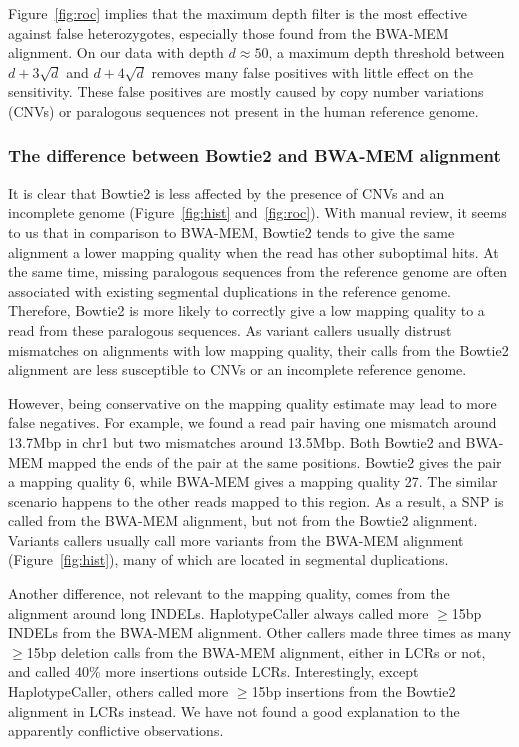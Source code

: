 \documentclass{bioinfo}
\begin{document}
Figure~\ref{fig:roc} implies that the maximum depth filter is the most
effective against false heterozygotes, especially those found from the BWA-MEM
alignment. On our data with depth $d\approx50$, a maximum depth threshold
between $d+3\sqrt{d}$ and $d+4\sqrt{d}$ removes many false positives with
little effect on the sensitivity. These false positives are mostly caused by
copy number variations (CNVs) or paralogous sequences not present in the human
reference genome.

\subsubsection{The difference between Bowtie2 and BWA-MEM alignment}
It is clear that Bowtie2 is less affected by the presence of CNVs and an
incomplete genome (Figure~\ref{fig:hist} and~\ref{fig:roc}). With manual
review, it seems to us that in comparison to BWA-MEM, Bowtie2 tends to give the
same alignment a lower mapping quality when the read has other suboptimal hits.
At the same time, missing paralogous sequences from the reference genome are
often associated with existing segmental duplications in the reference genome.
Therefore, Bowtie2 is more likely to correctly give a low mapping quality to a
read from these paralogous sequences. As variant callers usually distrust
mismatches on alignments with low mapping quality, their calls from the Bowtie2
alignment are less susceptible to CNVs or an incomplete reference genome.

However, being conservative on the mapping quality estimate may lead to more false
negatives. For example, we found a read pair having one mismatch around
13.7Mbp in chr1 but two mismatches around 13.5Mbp. Both Bowtie2 and BWA-MEM
mapped the ends of the pair at the same positions. Bowtie2 gives the pair a
mapping quality 6, while BWA-MEM gives a mapping quality 27. The similar
scenario happens to the other reads mapped to this region. As a result, a SNP
is called from the BWA-MEM alignment, but not from the Bowtie2 alignment.
Variants callers usually call more variants from the BWA-MEM alignment
(Figure~\ref{fig:hist}), many of which are located in segmental duplications.

Another difference, not relevant to the mapping quality, comes from the alignment
around long INDELs. HaplotypeCaller always called more $\ge$15bp INDELs from
the BWA-MEM alignment. Other callers made three times as many $\ge$15bp
deletion calls from the BWA-MEM alignment, either in LCRs or not, and called
40\% more insertions outside LCRs. Interestingly, except HaplotypeCaller,
others called more $\ge$15bp insertions from the Bowtie2 alignment in LCRs
instead. We have not found a good explanation to the apparently conflictive
observations.
\end{document}
